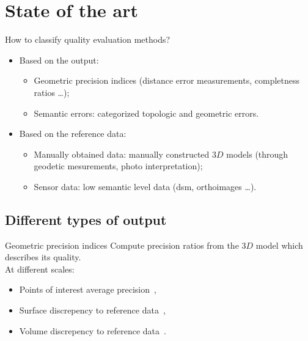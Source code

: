 \documentclass{beamer}
\begin{document}
    \section{State of the art}
        \begin{frame}{How to classify quality evaluation methods?}
            \begin{itemize}[label=$\blacktriangleright$, font=\color{IGNGreen}]
                \item Based on the output:
                \begin{itemize}[label=--]
                    \item Geometric precision indices (distance error measurements, completness ratios \dots);
                    \item Semantic errors: categorized topologic and geometric errors.
                \end{itemize}
                \item Based on the reference data:
                \begin{itemize}[label=--]
                    \item Manually obtained data: manually constructed $3D$ models (through geodetic mesurements, photo interpretation);
                    \item Sensor data: low semantic level data (\gls{dsm}, orthoimages \dots).
                \end{itemize}
            \end{itemize}
        \end{frame}
        \subsection{Different types of output}
            \begin{frame}{Geometric precision indices}
            	Compute precision ratios from the $3D$ model which describes its quality.\\
            	At different scales:
				\begin{itemize}[label=$\blacktriangleright$, font=\color{IGNGreen}]
					\item<1-> Points of interest average precision~\cite{Zeng2014, Voegtle2003},
					\item<2-> Surface discrepency to reference data~\cite{Zeng2014, Henricsson1997},
					\item<3-> Volume discrepency to reference data~\cite{Zeng2014}.
				\end{itemize}
            \end{frame}
\end{document}
